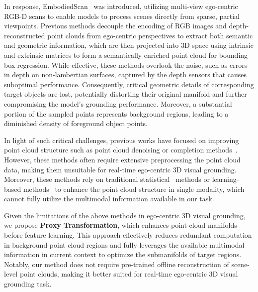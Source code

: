 In response, EmbodiedScan~\citep{wang2023embodiedscan} was introduced, utilizing multi-view ego-centric RGB-D scans to enable models to process scenes directly from sparse, partial viewpoints. Previous methods\cite{wang2023embodiedscan, zhu2024scanreasonempowering3dvisual, zhengdenseg,zhengdensegrounding} decouple the encoding of RGB images and depth-reconstructed point clouds from ego-centric perspectives to extract both semantic and geometric information, which are then projected into 3D space using intrinsic and extrinsic matrices to form a semantically enriched point cloud for bounding box regression. While effective, these methods overlook the noise, such as errors in depth on non-lambertian surfaces, captured by the depth sensors \cite{ikemura2024robust, tykkala2011direct, tariqul2017robust} that causes suboptimal performance. Consequently, critical geometric details of corresponding target objects are lost, potentially distorting their original manifold and further compromising the model’s grounding performance. Moreover, a substantial portion of the sampled points represents background regions, leading to a diminished density of foreground object points.

In light of such critical challenges, previous works have focused on improving point cloud structure such as point cloud denoising \cite{wang2023transformer,de2023iterativepfn,de2024straightpcf} or completion methods~\cite{boulch2022poco,leng2024point,zhang2024walkformer, yu2021pointr}. However, these methods often require extensive preprocessing the point cloud data, making them unsuitable for real-time ego-centric 3D visual grounding. Moreover, these methods rely on traditional statistical~\cite{vizzo2022make} methods or learning-based methods~\cite{luo2021score,rakotosaona2020pointcleannet} to enhance the point cloud structure in single modality, which cannot fully utilize the multimodal information available in our task.


Given the limitations of the above methods in ego-centric 3D visual grounding, we propose \textbf{Proxy Transformation}, which enhances point cloud manifolds before feature learning.
This approach effectively reduces redundant computation in background point cloud regions and fully leverages the available multimodal information in current context to optimize the submanifolds of target regions. Notably, our method does not require pre-trained offline reconstruction of scene-level point clouds, making it better suited for real-time ego-centric 3D visual grounding task.

